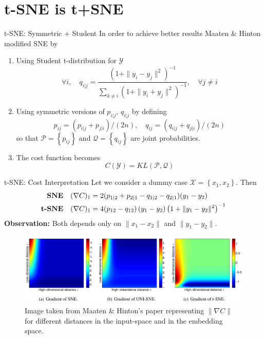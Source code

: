 \documentclass[10pt]{beamer}
\theoremstyle{definition}
\newcommand{\1}{\mathbbm{1}}
\newcommand{\XX}{\mathcal{X}}
\newcommand{\YY}{\mathcal{Y}}
\newcommand{\PP}{\mathcal{P}}
\newcommand{\QQ}{\mathcal{Q}}
\begin{document}
\section{t-SNE is t+SNE}
\begin{frame}{t-SNE: Symmetric + Student}
  In order to achieve better results Maaten \& Hinton modified SNE by
  \begin{enumerate}
    \item Using Student t-distribution for $\YY$
      \[
        \forall i,\quad
        q_{i|j} = \frac{(1+\|y_i-y_j\|^2)^{-1}}{\sum_{k\ne i}\left( 1+\|y_i +
        y_j\|^2\right)^{-1}},\quad \forall j\ne i
      \]
    \item Using symmetric versions of $p_{i|j},\,q_{i|j}$ by defining
      \[
        p_{ij}=\left( p_{i|j} + p_{j|i} \right)/(2n),\quad q_{ij}=\left(
        q_{i|j} + q_{j|i} \right)/(2n)
      \]
      so that $\PP = \left\{ p_{ij} \right\}$ and $\QQ=\left\{ q_{ij}
      \right\}$ are joint probabilities.
    \item The cost function becomes
      \[
        C(\YY) = KL(\PP,\QQ)
      \]
  \end{enumerate}
\end{frame}
\begin{frame}{t-SNE: Cost Interpretation}
  Let we consider a dummy case $\XX=\left\{ x_1,x_2 \right\}$. Then
  \begin{equation}
    \begin{aligned}
    \mbox{\bf SNE}\quad (\nabla C)_1 &=
      2(p_{1|2}+p_{2|1}-q_{1|2}-q_{2|1})(y_1-y_2)\\
      \mbox{\bf t-SNE}\quad (\nabla C )_1 &=
      4(p_{12}-q_{12})\left( y_1-y_2 \right)\left( 1+\|y_1 - y_2\|^2
      \right)^{-1}\\
    \end{aligned}
  \end{equation}
  {\bf Observation:} Both depends only on $\|x_1 -x_2\|$ and $\|y_1 -y_2\|$.
  \begin{figure}[h!]
    \centering
    \includegraphics[scale=0.17]{./pic/gradient.png}
    \caption{Image taken from Maaten \& Hinton's paper representing $\|\nabla
      C\|$ for different distances in the input-space and in the embedding
    space.}
  \end{figure}
\end{frame}
\end{document}
